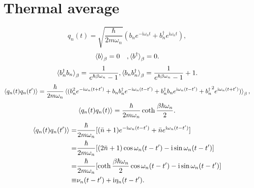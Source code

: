 \documentclass{article}
\renewcommand{\I}[0]{\mathrm{i}}
\begin{document}
\section{Thermal average}
$$q_n(t)=\sqrt{\frac{\hbar}{2m\omega_n}}(b_n e^{-\I \omega_n t}+b_n^\dagger e^{\I \omega_n t}),$$
$$\braket{b}_\beta=0\quad,\braket{b^\dagger}_\beta=0.$$
$$\braket{b_n^\dagger b_n}_\beta=\frac{1}{e^{\hbar\beta\omega_n}-1},\braket{b_n b_n^\dagger}_\beta=\frac{1}{e^{\hbar\beta\omega_n}-1}+1.$$
$$\braket{q_n(t)q_n(t')}=\frac{\hbar}{2m\omega_n}\braket{(b_n^2 e^{-\I\omega_n (t+t')}+b_n b_n^\dagger e^{-\I\omega_n(t-t')}+b_n^\dagger b_n e^{\I\omega_n(t-t')}+{b_n^\dagger}^2e^{\I\omega_n(t+t')} )}_\beta,$$
$$\braket{q_n(t)q_n(t)}=\frac{\hbar}{2m\omega_n}\coth\frac{\beta\hbar\omega_n}{2}.$$
\begin{equation*}
    \begin{split}
        \braket{q_n(t)q_n(t')}=&\frac{\hbar}{2m\omega_n}[(\bar{n}+1)e^{-\I\omega_n(t-t')}+\bar{n}e^{\I\omega_n(t-t')}]\\
        =&\frac{\hbar}{2m\omega_n}[(2\bar{n}+1)\cos \omega_n(t-t')-\I\sin \omega_n(t-t')]\\
        =&\frac{\hbar}{2m\omega_n}[\coth\frac{\beta\hbar\omega_n}{2}\cos \omega_n(t-t')-\I\sin \omega_n(t-t')]\\
        \equiv&\nu_n(t-t')+\I\eta_n(t-t').
    \end{split}
\end{equation*}
\end{document}
